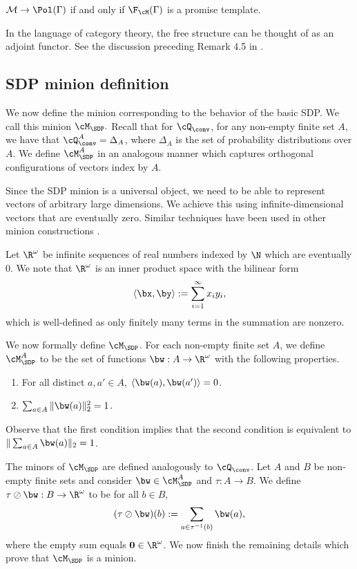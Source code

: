 {
\begin{lemma}\label{lem:free-structure}
$\mathcal M \to \Pol(\Gamma)$ if and only if $\F_{\cM}(\Gamma)$ is a promise template.
\end{lemma}
}

{In the language of category theory, the free structure can be thought of as an adjoint functor. See the discussion preceding Remark 4.5 in \cite{BBKO21}.} 


\subsection{SDP {m}inion {d}efinition}

{
We now define the minion corresponding to the behavior of the basic SDP. We call this minion $\cM_{\SDP}.$ Recall that for $\cQ_{\conv}$, for any non-empty finite set $A$, we have that $\cQ_{\conv}^A = \Delta_A$, where $\Delta_A$ is the set of probability distributions over $A$. We define $\cM_{\SDP}^A$ in an analogous manner which captures orthogonal configurations of vectors index by $A$.}

{S}ince the SDP minion is a universal object, we need to be able to represent vectors of arbitrary large dimensions. We achieve this using infinite-dimensional vectors that are eventually zero. Similar techniques have been used in other minion constructions \cite{ciardo2022clap}.

Let $\R^{\omega}$ be infinite sequences of real numbers {indexed by $\N$} which are eventually $0${.} {We note} that $\R^{\omega}$ is an inner product space {with the bilinear form}
\[
    {\langle \bx, \by \rangle := \sum_{i=1}^{\infty} x_i y_i,}
\]
{which is well-defined as only finitely many terms in the summation are nonzero.}

{We now formally define $\cM_{\SDP}$. For each non-empty finite set $A$, we define $\cM_{\SDP}^{A}$ to be the set of functions $\bw : A \to \R^{\omega}$ with the following properties.}

\begin{enumerate}
\item For all {distinct $a, a' \in A$, $\langle \bw(a), \bw(a')\rangle = 0$.}
\item $\sum_{{a \in A}} \|{\bw(a)}\|^2_2 = 1$.
\end{enumerate}
Observe that the {first condition implies that the} second condition is equivalent to $\|\sum_{{a \in A}} {\bw(a)}\|_2 = 1$.

The minors of $\cM_{\SDP}$ are {defined analogously to $\cQ_{\conv}$. Let $A$ and $B$ be non-empty finite sets and consider $\bw \in \cM_{\SDP}^A$ and $\tau : A \to B$. We define $\tau \oslash \bw : B \to \R^{\omega}$ to be for all $b \in B$,}
\[
    {(\tau \oslash \bw)(b) := \sum_{a \in \tau^{-1}(b)} \bw(a),}
\]
{where the empty sum equals $\mathbf{0} \in \R^{\omega}$. We now finish the remaining details which prove that $\cM_{\SDP}$ is a minion.}

